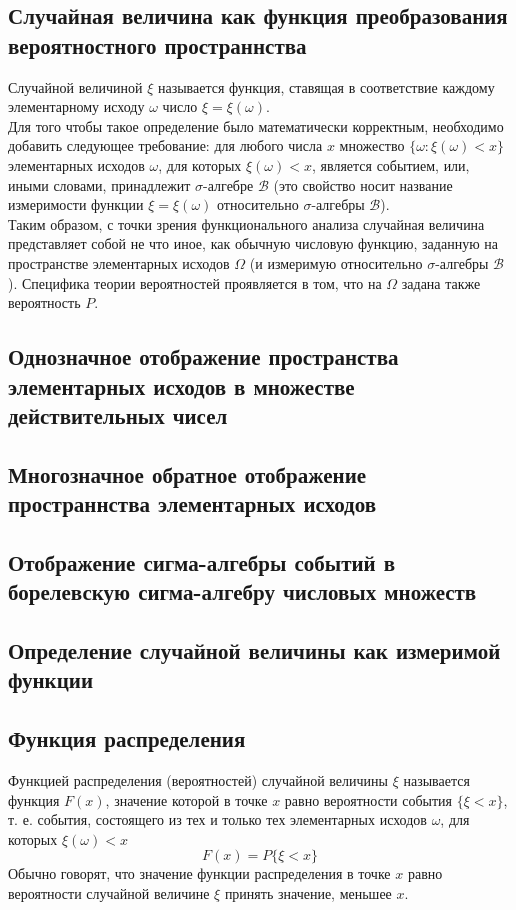 \documentclass[12pt]{article}
\begin{document}
\subsection{Случайная величина как функция преобразования вероятностного пространнства}
Случайной величиной $\xi$ называется функция,
ставящая в соответствие каждому элементарному исходу $\omega$ число $\xi = \xi(\omega)$. \\
Для того чтобы такое определение было математически корректным,
необходимо добавить следующее требование:
для любого числа $x$ множество $\{\omega: \xi(\omega) < x\}$ элементарных исходов $\omega$,
для которых $\xi(\omega) < x$, является событием, или, иными словами,
принадлежит $\sigma$-алгебре $\mathcal{B}$
(это свойство носит название измеримости функции $\xi = \xi(\omega)$
относительно $\sigma$-алгебры $\mathcal{B}$). \\
Таким образом, с точки зрения функционального анализа случайная величина представляет собой не что иное,
как обычную числовую функцию, заданную на пространстве элементарных исходов $\Omega$
(и измеримую относительно $\sigma$-алгебры $\mathcal{B}$).
Специфика теории вероятностей проявляется в том, что на $\Omega$ задана также вероятность $P$.

\subsection{Однозначное отображение пространства элементарных исходов в множестве действительных чисел}
\subsection{Многозначное обратное отображение пространнства элементарных исходов}
\subsection{Отображение сигма-алгебры событий в борелевскую сигма-алгебру числовых множеств}
\subsection{Определение случайной величины как измеримой функции}
\subsection{Функция распределения}
Функцией распределения (вероятностей) случайной величины $\xi$ называется функция $F(x)$,
значение которой в точке $x$ равно вероятности события $\{\xi < x\}$,
т. е. события, состоящего из тех и только тех элементарных исходов $\omega$, для которых $\xi(\omega) < x$
\[F(x) = P\{\xi < x\}\]
Обычно говорят, что значение функции распределения в точке $x$
равно вероятности случайной величине $\xi$ принять значение, меньшее $x$.
\end{document}
